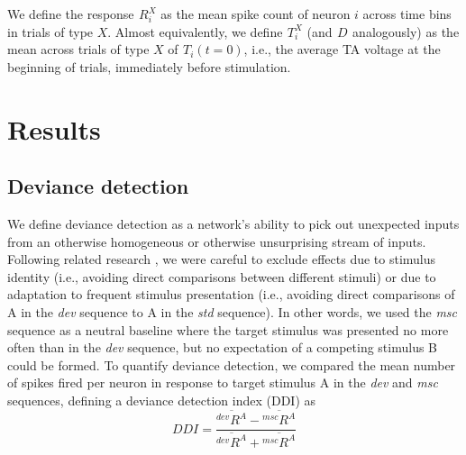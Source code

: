 \documentclass[pdflatex,referee,iicol,sn-basic]{sn-jnl}
\newcommand{\dev}{\textit{dev}}
\newcommand{\msc}{\textit{msc}}
\newcommand{\std}{\textit{std}}
\renewcommand{\R}[3][]{{}^{#1}_{}\!R^{#2}_{#3}}
\renewcommand{\T}[3][]{{}^{#1}_{}T^{#2}_{#3}}
\newcommand{\D}[3][]{{}^{#1}_{}\!D^{#2}_{#3}}
\newcommand{\mean}[1]{\overline{#1}}
\theoremstyle{thmstyleone}%
\theoremstyle{thmstyletwo}%
\theoremstyle{thmstylethree}%
\begin{document}
We define the response $\R{X}{i}$ as the mean spike count of neuron $i$ across time bins in trials of type $X$. Almost equivalently, we define $\T{X}{i}$ (and $\D{}{}$ analogously) as the mean across trials of type $X$ of $\T{}{i}(t=0)$, i.e., the average TA voltage at the beginning of trials, immediately before stimulation.

\section{Results}\label{sec-results}

\subsection{Deviance detection}\label{sec-dd}

We define deviance detection as a network's ability to pick out unexpected inputs from an otherwise homogeneous or otherwise unsurprising stream of inputs. Following related research \citep{Kubota2021-dx,Harms2014-ah,Jacobsen2001-sc}, we were careful to exclude effects due to stimulus identity (i.e., avoiding direct comparisons between different stimuli) or due to adaptation to frequent stimulus presentation (i.e., avoiding direct comparisons of A in the \dev{} sequence to A in the \std{} sequence). In other words, we used the \msc{} sequence as a neutral baseline where the target stimulus was presented no more often than in the \dev{} sequence, but no expectation of a competing stimulus B could be formed. To quantify deviance detection, we compared the mean number of spikes fired per neuron in response to target stimulus A in the \dev{} and \msc{} sequences, defining a deviance detection index (DDI) as
\begin{equation}
    DDI = \frac{\mean{\R[dev]{A}{}} - \mean{\R[msc]{A}{}}}{\mean{\R[dev]{A}{}} + \mean{\R[msc]{A}{}}} \label{eqn-ddi}
\end{equation}
\end{document}
